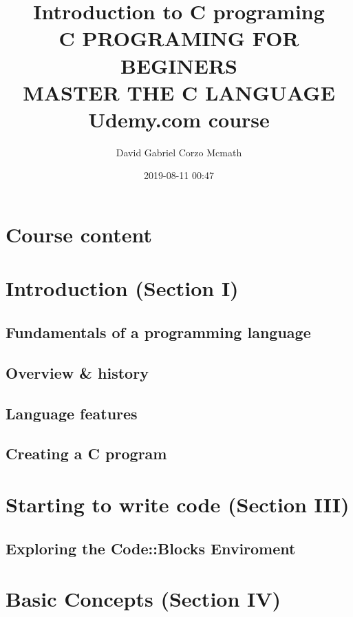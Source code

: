 \documentclass{book}
\author{David Gabriel Corzo Mcmath}
\title{Introduction to C programing \\ C PROGRAMING FOR BEGINERS \\MASTER THE C LANGUAGE \\ Udemy.com course}
\date{2019-08-11 00:47}
\begin{document}
\maketitle
\tableofcontents

\chapter*{Course content}

\chapter{Introduction (Section I)}


\section{Fundamentals of a programming language}


\section{Overview \& history}


\section{Language features}


\section{Creating a C program}


\chapter{Starting to write code (Section III)}
\section{Exploring the Code::Blocks Enviroment}


\chapter{Basic Concepts (Section IV)}
\end{document}

